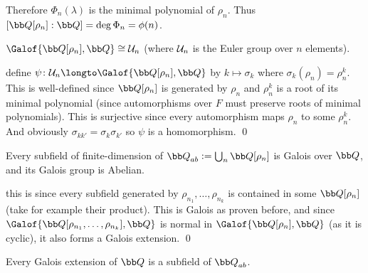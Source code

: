 Therefore $\Phi_n(\lambda)$ is the minimal polynomial of $\rho_n$.
Thus $[{\bb Q}[\rho_n]:{\bb Q}]=\deg\Phi_n=\phi(n)$.

\bprop

    $\Galof{{\bb Q}[\rho_n],{\bb Q}}\cong{\cal U}_n$ (where ${\cal U}_n$ is the Euler group over $n$ elements).

\eprop

\Proof define $\psi\colon{\cal U}_n\longto\Galof{{\bb Q}[\rho_n],{\bb Q}}$ by $k\mapsto\sigma_k$ where $\sigma_k(\rho_n)=\rho_n^k$.
This is well-defined since ${\bb Q}[\rho_n]$ is generated by $\rho_n$ and $\rho_n^k$ is a root of its minimal polynomial (since automorphisms over $F$ must preserve roots of minimal polynomials).
This is surjective since every automorphism maps $\rho_n$ to some $\rho_n^k$.
And obviously $\sigma_{kk'}=\sigma_k\sigma_{k'}$ so $\psi$ is a homomorphism.
\qed

\bcoro

    Every subfield of finite-dimension of ${\bb Q}_{ab}\coloneqq\bigcup_n{\bb Q}[\rho_n]$ is Galois over ${\bb Q}$, and its Galois group is Abelian.

\ecoro

\Proof this is since every subfield generated by $\rho_{n_1},\dots,\rho_{n_k}$ is contained in some ${\bb Q}[\rho_n]$ (take for example their product).
This is Galois as proven before, and since $\Galof{{\bb Q}[\rho_{n_1},\dots,\rho_{n_k}],{\bb Q}}$ is normal in $\Galof{{\bb Q}[\rho_n],{\bb Q}}$ (as it is cyclic), it also forms a Galois extension.
\qed

\bthrm[title=Kronecker-Weber Theorem]

    Every Galois extension of ${\bb Q}$ is a subfield of ${\bb Q}_{ab}$.

\ethrm

\bye

